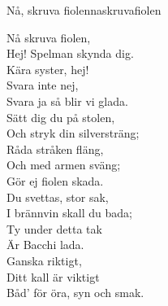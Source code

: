 \begin{song}{Nå, skruva fiolen}{naskruvafiolen}
\begin{vers}
    Nå skruva fiolen,\\
    Hej! Spelman skynda dig.\\
    Kära syster, hej!\\
    Svara inte nej,\\
    Svara ja så blir vi glada.\\
    Sätt dig du på stolen,\\
    Och stryk din silversträng;\\
    Råda stråken fläng,\\
    Och med armen sväng;\\
    Gör ej fiolen skada.\\
    Du svettas, stor sak,\\
    I brännvin skall du bada;\\
    Ty under detta tak\\
    Är Bacchi lada.\\
    Ganska riktigt,\\
    Ditt kall är viktigt\\
    Båd' för öra, syn och smak.\\
\end{vers}
\end{song}